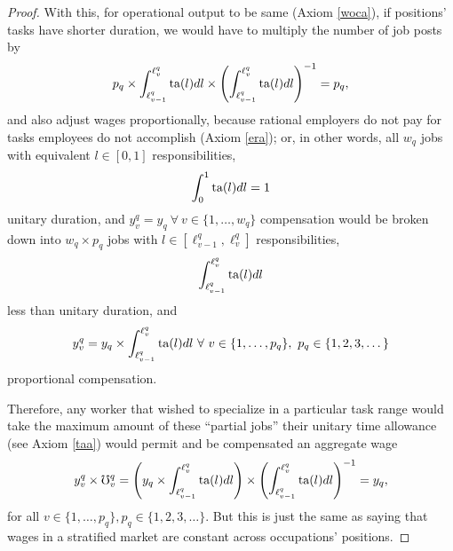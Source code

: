 \documentclass[hidelinks, nonatbib]{elsarticle}
\begin{document}
\begin{lemma}
\begin{proof}
        With this, for operational output to be same (Axiom \ref{woca}), if positions' tasks have shorter duration, we would have to multiply the number of job posts by
        \begin{gather}
            p_q
            \times
            \int_{\ell_{v-1}^{q}}^{\ell_{v}^{q}}
            \text{ta}(l)
            dl
            \times
            \left(
                \int_{\ell_{v-1}^{q}}^{\ell_{v}^{q}}
                \text{ta}(l)
                dl
            \right) ^ {-1}
            =
            p_q
            ,
        \end{gather}
        and also adjust wages proportionally, because rational employers do not pay for tasks employees do not  accomplish (Axiom \ref{era}); or, in other words, all $w_q$ jobs with equivalent $l \in [0,1]$ responsibilities,
        \begin{gather}
            \int_{0}^{1}
            \text{ta}(l)
            dl
            =
            1
        \end{gather}
        unitary duration, and $y_{v}^{q} = y_q \ \forall \ v \in \{1, \dots, w_q\}$ compensation would be broken down into $w_q \times p_q$ jobs with $l \in [\ell_{v-1}^{q},\ell_{v}^{q}]$ responsibilities,
        \begin{gather}
            \int_{\ell_{v-1}^{q}}^{\ell_{v}^{q}}
            \text{ta}(l)
            dl
        \end{gather}
        less than unitary duration, and
        \begin{gather}
            y_{v}^{q}
            =
            y_q
            \times
            \int_{\ell_{v-1}^{q}}^{\ell_{v}^{q}}
            \ta(l)
            dl
            \ 
            \forall 
            \ v \in \{1, \dots, p_q\}
            ,
            \ p_q \in \{1, 2, 3, \dots\}
        \end{gather}
        proportional compensation.

        Therefore, any worker that wished to specialize in a particular task range would take the maximum amount of these ``partial jobs'' their unitary time allowance (see Axiom \ref{taa}) would permit and be compensated an aggregate wage
        \begin{gather}
            y_{v}^{q}
            \times
            \mho_{v}^{q}
            =
            \left(
                y_q
                \times
                \int_{\ell_{v-1}^{q}}^{\ell_{v}^{q}}
                \text{ta}(l)
                dl
            \right)
            \times
            \left(
                \int_{\ell_{v-1}^{q}}^{\ell_{v}^{q}}
                \text{ta}(l)
                dl
            \right) ^ {-1}
            =
            y_q
            ,
        \end{gather}
        for all $v \in \{1, \dots, p_q\}, p_q \in \{1, 2, 3, \dots\}$. But this is just the same as saying that wages in a stratified market are constant across occupations' positions.
    \end{proof}
\end{lemma} 
\end{document}
